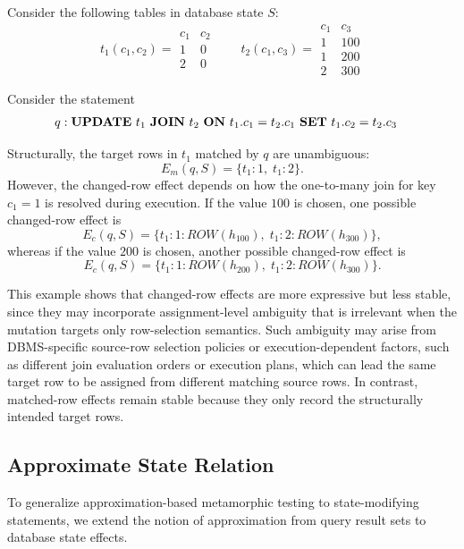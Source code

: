 \begin{example}
	Consider the following tables in database state $S$:
	\[
	t_1(c_1, c_2)=
	\begin{array}{c|c}
		c_1 & c_2 \\
		\hline
		1 & 0 \\
		2 & 0
	\end{array}
	\qquad
	t_2(c_1, c_3)=
	\begin{array}{c|c}
		c_1 & c_3 \\
		\hline
		1 & 100 \\
		1 & 200 \\
		2 & 300
	\end{array}
	\]
	
	Consider the statement
	\[
	\begin{aligned}
		q : &\; \text{\textbf{UPDATE} } t_1
		\text{ \textbf{JOIN} } t_2
		\text{ \textbf{ON} } t_1.c_1 = t_2.c_1 
		\text{ \textbf{SET} } t_1.c_2 = t_2.c_3 
	\end{aligned}
	\]
	
	Structurally, the target rows in $t_1$ matched by $q$ are unambiguous:
	\[
	E_m(q,S)=\{t_1\!:\!1,\; t_1\!:\!2\}.
	\]
	However, the changed-row effect depends on how the one-to-many join for key $c_1=1$ is resolved during execution. 
	If the value $100$ is chosen, one possible changed-row effect is
	\[
	E_c(q,S)=\{t_1\!:\!1\!:\!\mathit{ROW}(h_{100}),\; t_1\!:\!2\!:\!\mathit{ROW}(h_{300})\},
	\]
	whereas if the value $200$ is chosen, another possible changed-row effect is
	\[
	E_c(q,S)=\{t_1\!:\!1\!:\!\mathit{ROW}(h_{200}),\; t_1\!:\!2\!:\!\mathit{ROW}(h_{300})\}.
	\]
	
	This example shows that changed-row effects are more expressive but less stable, since they may incorporate assignment-level ambiguity that is irrelevant when the mutation targets only row-selection semantics. 
	Such ambiguity may arise from DBMS-specific source-row selection policies or execution-dependent factors, such as different join evaluation orders or execution plans, which can lead the same target row to be assigned from different matching source rows.
	In contrast, matched-row effects remain stable because they only record the structurally intended target rows.
\end{example}

\subsection{Approximate State Relation}
To generalize approximation-based metamorphic testing to state-modifying statements, we extend the notion of approximation from query result sets to database state effects.

